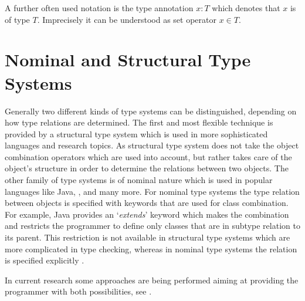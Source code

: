 \begin{mathpar}
\end{mathpar}

A further often used notation is the type annotation $x:T$ which denotes
that $x$ is of type $T$. Imprecisely it can be understood as set operator
$x \in T$.

\section{Nominal and Structural Type Systems}


Generally two different kinds of type systems can be distinguished,
depending on how type relations are determined. The first and most
flexible technique is provided by a structural type system which is
used in more sophisticated languages and research topics. As structural
type system does not take the object combination operators which are
used into account, but rather takes care of the object's structure in
order to determine the relations between two objects. The other family
of type systems is of nominal nature which is used in popular languages
like Java, \cs, \cpp and many more. For nominal type systems the type
relation between objects is specified with keywords that are used for
class combination. For example, Java provides an `\emph{extends}' keyword
which makes the combination and restricts the programmer to define only
classes that are in subtype relation to its parent. This restriction is
not available in structural type systems which are more complicated in
type checking, whereas in nominal type systems the relation is specified
explicitly \cite{malayeri_integrating_2008,pierce_types_2002}.

In current research some approaches are being performed aiming
at providing the programmer with both possibilities, see
\cite{findler_semantic_2004,gil_whiteoak:_2008,malayeri_integrating_2008}.

